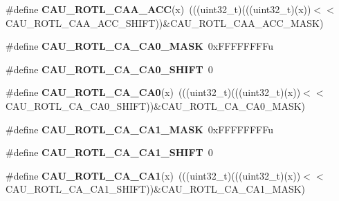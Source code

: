 \begin{DoxyCompactItemize}
\item 
\#define {\bfseries C\+A\+U\+\_\+\+R\+O\+T\+L\+\_\+\+C\+A\+A\+\_\+\+A\+CC}(x)~(((uint32\+\_\+t)(((uint32\+\_\+t)(x))$<$$<$C\+A\+U\+\_\+\+R\+O\+T\+L\+\_\+\+C\+A\+A\+\_\+\+A\+C\+C\+\_\+\+S\+H\+I\+FT))\&C\+A\+U\+\_\+\+R\+O\+T\+L\+\_\+\+C\+A\+A\+\_\+\+A\+C\+C\+\_\+\+M\+A\+SK)\hypertarget{group__CAU__Register__Masks_ga1063642340f6774011d044d0abe0ee8d}{}\label{group__CAU__Register__Masks_ga1063642340f6774011d044d0abe0ee8d}

\item 
\#define {\bfseries C\+A\+U\+\_\+\+R\+O\+T\+L\+\_\+\+C\+A\+\_\+\+C\+A0\+\_\+\+M\+A\+SK}~0x\+F\+F\+F\+F\+F\+F\+F\+Fu\hypertarget{group__CAU__Register__Masks_ga2b86bab9480c6bf6115dad260ab161a3}{}\label{group__CAU__Register__Masks_ga2b86bab9480c6bf6115dad260ab161a3}

\item 
\#define {\bfseries C\+A\+U\+\_\+\+R\+O\+T\+L\+\_\+\+C\+A\+\_\+\+C\+A0\+\_\+\+S\+H\+I\+FT}~0\hypertarget{group__CAU__Register__Masks_ga3181be32a342d2194fc201a642c18878}{}\label{group__CAU__Register__Masks_ga3181be32a342d2194fc201a642c18878}

\item 
\#define {\bfseries C\+A\+U\+\_\+\+R\+O\+T\+L\+\_\+\+C\+A\+\_\+\+C\+A0}(x)~(((uint32\+\_\+t)(((uint32\+\_\+t)(x))$<$$<$C\+A\+U\+\_\+\+R\+O\+T\+L\+\_\+\+C\+A\+\_\+\+C\+A0\+\_\+\+S\+H\+I\+FT))\&C\+A\+U\+\_\+\+R\+O\+T\+L\+\_\+\+C\+A\+\_\+\+C\+A0\+\_\+\+M\+A\+SK)\hypertarget{group__CAU__Register__Masks_ga75587dbec3309dd33c787776321096eb}{}\label{group__CAU__Register__Masks_ga75587dbec3309dd33c787776321096eb}

\item 
\#define {\bfseries C\+A\+U\+\_\+\+R\+O\+T\+L\+\_\+\+C\+A\+\_\+\+C\+A1\+\_\+\+M\+A\+SK}~0x\+F\+F\+F\+F\+F\+F\+F\+Fu\hypertarget{group__CAU__Register__Masks_gabfb4747ca51ec2bf523adf1d27b3a55c}{}\label{group__CAU__Register__Masks_gabfb4747ca51ec2bf523adf1d27b3a55c}

\item 
\#define {\bfseries C\+A\+U\+\_\+\+R\+O\+T\+L\+\_\+\+C\+A\+\_\+\+C\+A1\+\_\+\+S\+H\+I\+FT}~0\hypertarget{group__CAU__Register__Masks_ga7a9ebabc5cddc8cb1d94f2b371b614d2}{}\label{group__CAU__Register__Masks_ga7a9ebabc5cddc8cb1d94f2b371b614d2}

\item 
\#define {\bfseries C\+A\+U\+\_\+\+R\+O\+T\+L\+\_\+\+C\+A\+\_\+\+C\+A1}(x)~(((uint32\+\_\+t)(((uint32\+\_\+t)(x))$<$$<$C\+A\+U\+\_\+\+R\+O\+T\+L\+\_\+\+C\+A\+\_\+\+C\+A1\+\_\+\+S\+H\+I\+FT))\&C\+A\+U\+\_\+\+R\+O\+T\+L\+\_\+\+C\+A\+\_\+\+C\+A1\+\_\+\+M\+A\+SK)\hypertarget{group__CAU__Register__Masks_gacb972ecc560e0270bf5f6f02fc7e8eda}{}\label{group__CAU__Register__Masks_gacb972ecc560e0270bf5f6f02fc7e8eda}


\end{DoxyCompactItemize}
